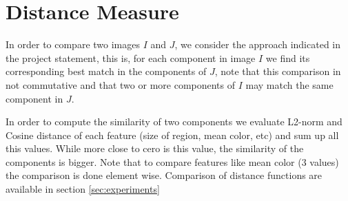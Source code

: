 \section{Distance Measure}
In order to compare two images $I$ and $J$, we consider the approach indicated in the project statement, this is, for each component in image $I$ we find its corresponding best match in the components of $J$, note that this comparison in not commutative and that two or more components of $I$ may match the same component in $J$. 

In order to compute the similarity of two components we evaluate L2-norm and Cosine distance of each feature (size of region, mean color, etc) and sum up all this values. While more close to cero is this value, the similarity of the components is bigger. Note that to compare features like mean color (3 values) the comparison is done element wise. Comparison of distance functions are available in section \ref{sec:experiments}

